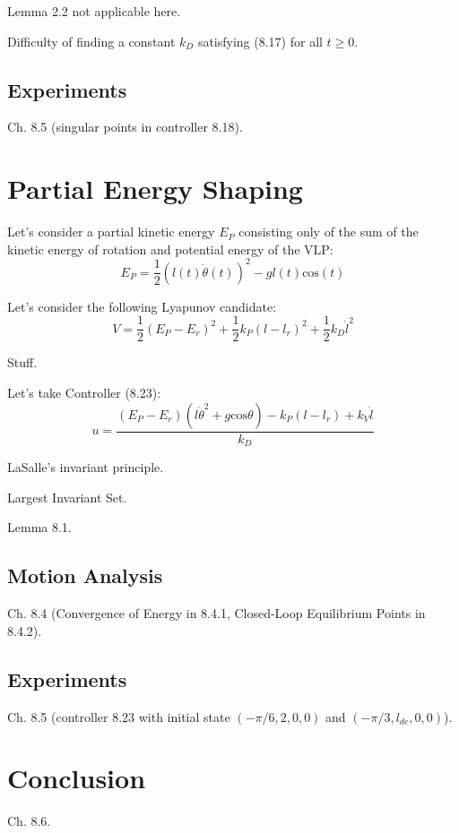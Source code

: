 \documentclass[a4paper]{article}
\begin{document}
Lemma 2.2 not applicable here.

Difficulty of finding a constant $k_D$ satisfying (8.17) for all $t \ge 0$.

\subsection{Experiments}
Ch. 8.5 (singular points in controller 8.18).

\section{Partial Energy Shaping}
Let's consider a partial kinetic energy $E_P$ consisting only of the sum of the
kinetic energy of rotation and potential energy of the VLP:
\begin{equation}
  E_P = \frac{1}{2} (l(t)\dot{\theta}(t))^2 - gl(t)\text{cos}(t)
\end{equation}

Let's consider the following Lyapunov candidate:
\begin{equation}
  V = \frac{1}{2} (E_P - E_r)^2 +
      \frac{1}{2} k_P (l - l_r)^2 +
      \frac{1}{2} k_D \dot{l}^2
\end{equation}

Stuff.

Let's take Controller (8.23):
\begin{equation}
  u = \frac{(E_P - E_r)(l\dot{\theta}^2 + g\text{cos}\theta) - k_P(l - l_r)
    + k_V \dot{l}}{k_D}
\end{equation}

LaSalle's invariant principle.

Largest Invariant Set.

Lemma 8.1.

\subsection{Motion Analysis}
Ch. 8.4 (Convergence of Energy in 8.4.1, Closed-Loop Equilibrium Points in
8.4.2).

\subsection{Experiments}
Ch. 8.5 (controller 8.23 with initial state $(-\pi/6, 2, 0, 0)$ and
$(-\pi/3, l_{de}, 0, 0)$).

\section{Conclusion}
Ch. 8.6.
\end{document}

